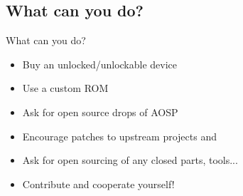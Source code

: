 \documentclass[aspectratio=169]{beamer}
\begin{document}
  \subsection{What can you do?}
    \begin{frame}{What can you do?}
      \begin{itemize}
        \item<1-> Buy an unlocked/unlockable device
        \item<2-> Use a custom ROM
        \item<3-> Ask for open source drops of AOSP 
        \item<4-> Encourage patches to upstream projects and 
        \item<5-> Ask for open sourcing of any closed parts, tools...
        \item<6-> Contribute and cooperate yourself! 
      \end{itemize}
    \end{frame}
\end{document}
